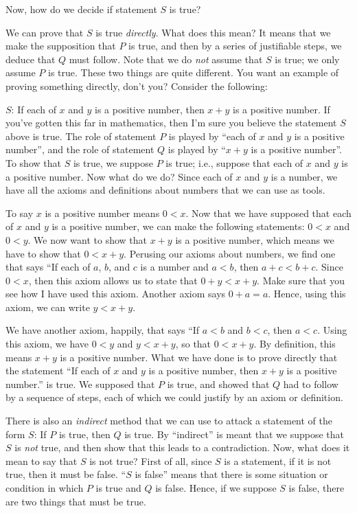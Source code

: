 \documentclass[english]{book}
\begin{document}
Now, how do we decide if statement $S$ is true?

We can prove that $S$ is true \emph{directly}. What does this mean? It means that we make the supposition that $P$ is true, and then by a series of justifiable steps, we deduce that $Q$ must follow. Note that we do \emph{not} assume that $S$ is true; we only assume $P$ is true. These two things are quite different. You want an example of proving something directly, don't you? Consider the following:

$S$: If each of $x$ and $y$ is a positive number, then $x+y$ is a positive number. If you've gotten this far in mathematics, then I'm sure you believe the statement $S$ above is true. The role of statement $P$ is played by ``each of $x$ and $y$ is a positive number'', and the role of statement $Q$ is played by ``$x+y$ is a positive number''. To show that $S$ is true, we suppose $P$ is true; i.e., suppose that each of $x$ and $y$ is a positive number. Now what do we do? Since each of $x$ and $y$ is a number, we have all the axioms and definitions about numbers that we can use as tools. 

To say $x$ is a positive number means $0<x$. Now that we have supposed that each of $x$ and $y$ is a positive number, we can make the following statements: $0<x$ and $0<y$. We now want to show that $x+y$ is a positive number, which means we have to show that $0<x+y$. Perusing our axioms about numbers, we find one that says ``If each of $a$, $b$, and $c$ is a number and $a<b$, then $a+c<b+c$. Since $0<x$, then this axiom allows us to state that $0+y<x+y$. Make sure that you see how I have used this axiom. Another axiom says $0+a=a$. Hence, using this axiom, we can write $y<x+y$.

We have another axiom, happily, that says ``If $a<b$ and $b<c$, then $a<c$. Using this axiom, we have $0<y$ and $y<x+y$, so that $0<x+y$. By definition, this means $x+y$ is a positive number. What we have done is to prove directly that the statement ``If each of $x$ and $y$ is a positive number, then $x+y$ is a positive number.'' is true. We supposed that $P$ is true, and showed that $Q$ had to follow by a sequence of steps, each of which we could justify by an axiom or definition. 

There is also an \emph{indirect} method that we can use to attack a statement of the form $S$: If $P$ is true, then $Q$ is true. By ``indirect'' is meant that we suppose that $S$ is \emph{not} true, and then show that this leads to a contradiction. Now, what does it mean to say that $S$ is not true? First of all, since $S$ is a statement, if it is not true, then it must be false. ``$S$ is false'' means that there is some situation or condition in which $P$ is true and $Q$ is false. Hence, if we suppose $S$ is false, there are two things that must be true.
\end{document}
